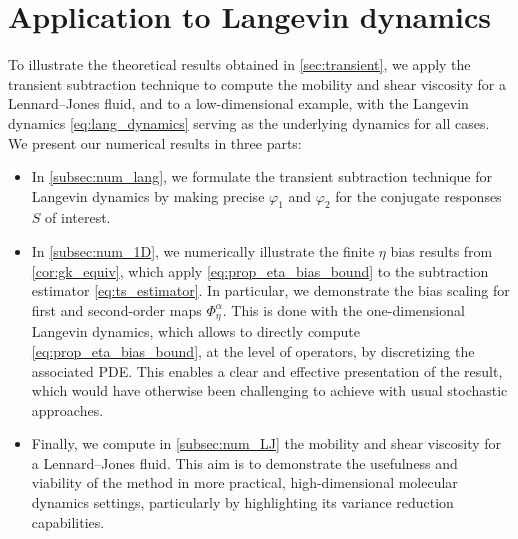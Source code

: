 \section{Application to Langevin dynamics}
\label{sec:numerical}
%
%
%
To illustrate the theoretical results obtained in \cref{sec:transient}, we apply the transient subtraction technique to compute the mobility and shear viscosity for a Lennard--Jones fluid, and to a low-dimensional example, with the Langevin dynamics \eqref{eq:lang_dynamics} serving as the underlying dynamics for all cases. We present our numerical results in three parts:
%
\begin{itemize}
	\item In \cref{subsec:num_lang}, we formulate the transient subtraction technique for Langevin dynamics by making precise $\varphi_1$ and $\varphi_2$ for the conjugate responses $S$ of interest.
	 \item In \cref{subsec:num_1D}, we numerically illustrate the finite $\eta$ bias results from \cref{cor:gk_equiv}, which apply \eqref{eq:prop_eta_bias_bound} to the subtraction estimator \eqref{eq:ts_estimator}. In particular, we demonstrate the bias scaling for first and second-order maps $\Phi_\eta^\alpha$. This is done with the one-dimensional Langevin dynamics, which allows to directly compute \eqref{eq:prop_eta_bias_bound}, at the level of operators, by discretizing the associated PDE. This enables a clear and effective presentation of the result, which would have otherwise been challenging to achieve with usual stochastic approaches. %
	 \item Finally, we compute in \cref{subsec:num_LJ} the mobility and shear viscosity for a Lennard--Jones fluid. This aim is to demonstrate the usefulness and viability of the method in more practical, high-dimensional molecular dynamics settings, particularly by highlighting its variance reduction capabilities.
%
\end{itemize}

